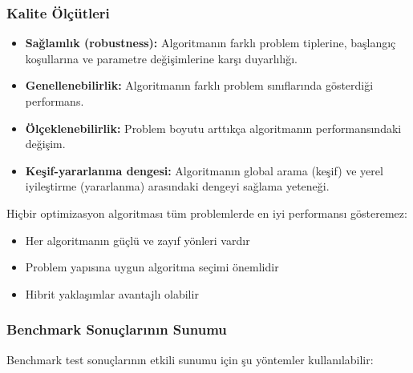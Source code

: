 \subsubsection{Kalite Ölçütleri}

\begin{itemize}
    \item \textbf{Sağlamlık (robustness):} Algoritmanın farklı problem tiplerine, başlangıç koşullarına ve parametre değişimlerine karşı duyarlılığı.
    
    \item \textbf{Genellenebilirlik:} Algoritmanın farklı problem sınıflarında gösterdiği performans.
    
    \item \textbf{Ölçeklenebilirlik:} Problem boyutu arttıkça algoritmanın performansındaki değişim.
    
    \item \textbf{Keşif-yararlanma dengesi:} Algoritmanın global arama (keşif) ve yerel iyileştirme (yararlanma) arasındaki dengeyi sağlama yeteneği.
\end{itemize}


\begin{tcolorbox}[title=No Free Lunch Teoremi]
Hiçbir optimizasyon algoritması tüm problemlerde en iyi performansı gösteremez:
\begin{itemize}
    \item Her algoritmanın güçlü ve zayıf yönleri vardır
    \item Problem yapısına uygun algoritma seçimi önemlidir
    \item Hibrit yaklaşımlar avantajlı olabilir
\end{itemize}
\end{tcolorbox}

\subsubsection{Benchmark Sonuçlarının Sunumu}

Benchmark test sonuçlarının etkili sunumu için şu yöntemler kullanılabilir:

